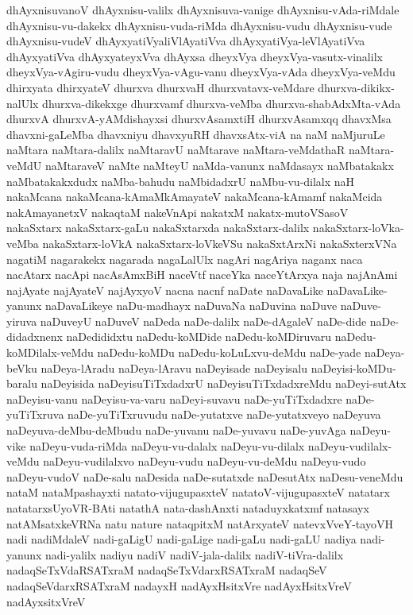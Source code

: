 {dhAyxnisuvanoV
dhAyxnisu-valilx
dhAyxnisuva-vanige
dhAyxnisu-vAda-riMdale
dhAyxnisu-vu-dakekx
dhAyxnisu-vuda-riMda
dhAyxnisu-vudu
dhAyxnisu-vude
dhAyxnisu-vudeV
dhAyxyatiVyaliVlAyatiVva
dhAyxyatiVya-leVlAyatiVva
dhAyxyatiVva
dhAyxyateyxVva
dhAyxsa
dheyxVya
dheyxVya-vasutx-vinalilx
dheyxVya-vAgiru-vudu
dheyxVya-vAgu-vanu
dheyxVya-vAda
dheyxVya-veMdu
dhirxyata
dhirxyateV
dhurxva
dhurxvaH
dhurxvatavx-veMdare
dhurxva-dikikx-nalUlx
dhurxva-dikekxge
dhurxvamf
dhurxva-veMba
dhurxva-shabAdxMta-vAda
dhurxvA
dhurxvA-yAMdishayxsi
dhurxvAsamxtiH
dhurxvAsamxqq
dhavxMsa
dhavxni-gaLeMba
dhavxniyu
dhavxyuRH
dhavxsAtx-viA
na
naM
naMjuruLe
naMtara
naMtara-dalilx
naMtaravU
naMtarave
naMtara-veMdathaR
naMtara-veMdU
naMtaraveV
naMte
naMteyU
naMda-vanunx
naMdasayx
naMbatakakx
naMbatakakxdudx
naMba-bahudu
naMbidadxrU
naMbu-vu-dilalx
naH
nakaMcana
nakaMcana-kAmaMkAmayateV
nakaMcana-kAmamf
nakaMcida
nakAmayanetxV
nakaqtaM
nakeVnApi
nakatxM
nakatx-mutoVSasoV
nakaSxtarx
nakaSxtarx-gaLu
nakaSxtarxda
nakaSxtarx-dalilx
nakaSxtarx-loVka-veMba
nakaSxtarx-loVkA
nakaSxtarx-loVkeVSu
nakaSxtArxNi
nakaSxterxVNa
nagatiM
nagarakekx
nagarada
nagaLalUlx
nagAri
nagAriya
naganx
naca
nacAtarx
nacApi
nacAsAmxBiH
naceVtf
naceYka
naceYtArxya
naja
najAnAmi
najAyate
najAyateV
najAyxyoV
nacna
nacnf
naDate
naDavaLike
naDavaLike-yanunx
naDavaLikeye
naDu-madhayx
naDuvaNa
naDuvina
naDuve
naDuve-yiruva
naDuveyU
naDuveV
naDeda
naDe-dalilx
naDe-dAgaleV
naDe-dide
naDe-didadxnenx
naDedididxtu
naDedu-koMDide
naDedu-koMDiruvaru
naDedu-koMDilalx-veMdu
naDedu-koMDu
naDedu-koLuLxvu-deMdu
naDe-yade
naDeya-beVku
naDeya-lAradu
naDeya-lAravu
naDeyisade
naDeyisalu
naDeyisi-koMDu-baralu
naDeyisida
naDeyisuTiTxdadxrU
naDeyisuTiTxdadxreMdu
naDeyi-sutAtx
naDeyisu-vanu
naDeyisu-va-varu
naDeyi-suvavu
naDe-yuTiTxdadxre
naDe-yuTiTxruva
naDe-yuTiTxruvudu
naDe-yutatxve
naDe-yutatxveyo
naDeyuva
naDeyuva-deMbu-deMbudu
naDe-yuvanu
naDe-yuvavu
naDe-yuvAga
naDeyu-vike
naDeyu-vuda-riMda
naDeyu-vu-dalalx
naDeyu-vu-dilalx
naDeyu-vudilalx-veMdu
naDeyu-vudilalxvo
naDeyu-vudu
naDeyu-vu-deMdu
naDeyu-vudo
naDeyu-vudoV
naDe-salu
naDesida
naDe-sutatxde
naDesutAtx
naDesu-veneMdu
nataM
nataMpashayxti
natato-vijugupasxteV
natatoV-vijugupasxteV
natatarx
natatarxsUyoVR-BAti
natathA
nata-dashAnxti
nataduyxkatxmf
natasayx
natAMsatxkeVRNa
natu
nature
nataqpitxM
natArxyateV
natevxVveY-tayoVH
nadi
nadiMdaleV
nadi-gaLigU
nadi-gaLige
nadi-gaLu
nadi-gaLU
nadiya
nadi-yanunx
nadi-yalilx
nadiyu
nadiV
nadiV-jala-dalilx
nadiV-tiVra-dalilx
nadaqSeTxVdaRSATxraM
nadaqSeTxVdarxRSATxraM
nadaqSeV
nadaqSeVdarxRSATxraM
nadayxH
nadAyxHsitxVre
nadAyxHsitxVreV
nadAyxsitxVreV
}

